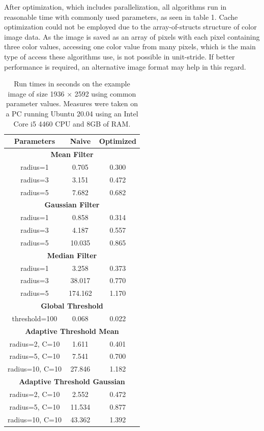 \documentclass[sigconf]{acmart}
\begin{document}
After optimization, which includes parallelization, all algorithms run in reasonable time with commonly used parameters, as seen in table 1.  Cache optimization could not be employed due to the array-of-structs structure of color image data. As the image is saved as an array of pixels with each pixel containing three color values, accessing one color value from many pixels, which is the main type of access these algorithms use, is not possible in unit-stride. If better performance is required, an alternative image format may help in this regard.

\begin{table}[]
    \centering
    \begin{tabular}{c | c c}
        Parameters & Naive & Optimized \vspace{0.05cm} \\ \hline
        \multicolumn{3}{c}{\textbf{Mean Filter}} \\ \hline
        radius=1 & 0.705 & 0.300 \\
        radius=3 & 3.151 & 0.472 \\
        radius=5 & 7.682 & 0.682 \\ \hline
        \multicolumn{3}{c}{\textbf{Gaussian Filter}} \\  \hline
        radius=1 & 0.858 & 0.314 \\
        radius=3 & 4.187 & 0.557 \\
        radius=5 & 10.035 & 0.865 \\ \hline
        \multicolumn{3}{c}{\textbf{Median Filter}} \\  \hline
        radius=1 & 3.258 & 0.373 \\
        radius=3 & 38.017 & 0.770 \\
        radius=5 & 174.162 & 1.170 \\ \hline
        \multicolumn{3}{c}{\textbf{Global Threshold}} \\  \hline
        threshold=100 & 0.068 & 0.022 \\ \hline
        \multicolumn{3}{c}{\textbf{Adaptive Threshold Mean}} \\  \hline
        radius=2, C=10 & 1.611 & 0.401 \\
        radius=5, C=10 & 7.541 & 0.700 \\
        radius=10, C=10 & 27.846 & 1.182 \\ \hline
        \multicolumn{3}{c}{\textbf{Adaptive Threshold Gaussian}} \\  \hline
        radius=2, C=10 & 2.552 & 0.472 \\
        radius=5, C=10 & 11.534 & 0.877 \\
        radius=10, C=10 & 43.362 & 1.392 \\ \hline
    \end{tabular}
    \caption{Run times in seconds on the example image of size 1936 $\times$ 2592 using common parameter values. Measures were taken on a PC running Ubuntu 20.04 using an Intel Core i5 4460 CPU and 8GB of RAM.}
\end{table}
\end{document}
